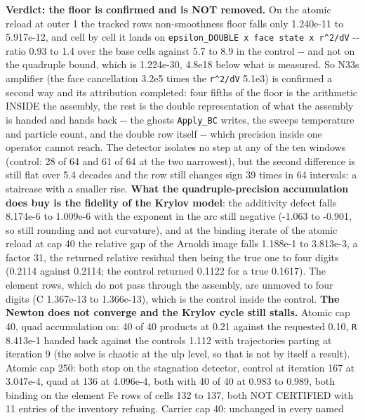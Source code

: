 \documentclass[english,a4paper]{my_memo}
\begin{document}
\begin{itemize}
  \textbf{Verdict: the floor is confirmed and is NOT removed.} On the atomic
  reload at outer 1 the tracked row\textquotesingle s non-smoothness floor falls only
  1.240e-11 to 5.917e-12, and cell by cell it lands on
  \texttt{epsilon\_DOUBLE\ x\ face\ state\ x\ r\^{}2/dV} -\/- ratio 0.93 to 1.4 over the base
  cells against 5.7 to 8.9 in the control -\/- and not on the quadruple
  bound, which is 1.224e-30, 4.8e18 below what is measured. So N33\textquotesingle s
  amplifier (the face cancellation 3.2e5 times the \texttt{r\^{}2/dV} 5.1e3) is
  confirmed a second way and its attribution completed: four fifths of the
  floor is the arithmetic INSIDE the assembly, the rest is the double
  representation of what the assembly is handed and hands back -\/- the
  ghosts \texttt{Apply\_BC} writes, the sweep\textquotesingle s temperature and particle count,
  and the double row itself -\/- which precision inside one operator cannot
  reach. The detector isolates no step at any of the ten windows (control:
  28 of 64 and 61 of 64 at the two narrowest), but the second difference is
  still flat over 5.4 decades and the row still changes sign 39 times in
  64 intervals: a staircase with a smaller rise. \textbf{What the quadruple-precision accumulation does buy
  is the fidelity of the Krylov model}: the additivity defect falls
  8.174e-6 to 1.009e-6 with the exponent in the arc still negative
  (-1.063 to -0.901, so still rounding and not curvature), and at the
  binding iterate of the atomic reload at cap 40 the relative gap of the
  Arnoldi image falls 1.188e-1 to 3.813e-3, a factor 31, the returned
  relative residual then being the true one to four digits (0.2114 against
  0.2114; the control returned 0.1122 for a true 0.1617). The element rows,
  which do not pass through the assembly, are unmoved to four digits
  (C 1.367e-13 to 1.366e-13), which is the control inside the control.
  \textbf{The Newton does not converge and the Krylov cycle still stalls.}
  Atomic cap 40, quad accumulation on: 40 of 40 products at 0.21 against the requested
  0.10, \texttt{\textbar{}\textbar{}R\textbar{}\textbar{}} 8.413e-1 handed back against the control\textquotesingle s 1.112 with
  trajectories parting at iteration 9 (the solve is chaotic at the ulp level,
  so that is not by itself a result). Atomic cap 250: both stop on the
  stagnation detector, control at iteration 167 at 3.047e-4, quad at 136 at
  4.096e-4, both with 40 of 40 at 0.983 to 0.989, both binding on the
  element Fe rows of cells 132 to 137, both NOT CERTIFIED with 11 entries
  of the inventory refusing. Carrier cap 40: unchanged in every named

\end{itemize}
\end{document}
